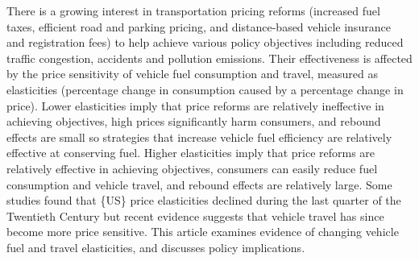 There is a growing interest in transportation pricing reforms (increased fuel taxes, efficient road and parking pricing, and distance-based vehicle insurance and registration fees) to help achieve various policy objectives including reduced traffic congestion, accidents and pollution emissions. Their effectiveness is affected by the price sensitivity of vehicle fuel consumption and travel, measured as elasticities (percentage change in consumption caused by a percentage change in price). Lower elasticities imply that price reforms are relatively ineffective in achieving objectives, high prices significantly harm consumers, and rebound effects are small so strategies that increase vehicle fuel efficiency are relatively effective at conserving fuel. Higher elasticities imply that price reforms are relatively effective in achieving objectives, consumers can easily reduce fuel consumption and vehicle travel, and rebound effects are relatively large. Some studies found that \{US\} price elasticities declined during the last quarter of the Twentieth Century but recent evidence suggests that vehicle travel has since become more price sensitive. This article examines evidence of changing vehicle fuel and travel elasticities, and discusses policy implications.